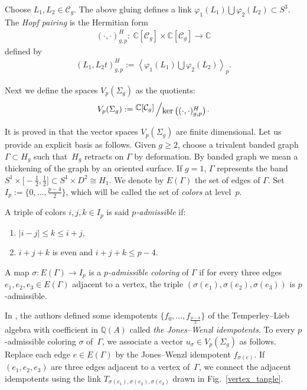 \documentclass[11pt]{article}
\numberwithin{equation}{section}
\begin{document}
Choose $L_1,L_2\in \mathcal{C}_g$. The above gluing defines a link $\varphi_1(L_1)\bigcup \varphi_2(L_2) \subset S^3$. The \textit{Hopf pairing} is the Hermitian form
\begin{gather*} ( \cdot , \cdot )_{g,p}^H \colon \ \mathbb{C}[\mathcal{C}_g]\times \mathbb{C}[\mathcal{C}_g] \rightarrow \mathbb{C}\end{gather*}
defined by \begin{gather*} ( L_1, L_2 t)_{g,p}^H := \left\langle \varphi_1(L_1)\bigcup \varphi_2(L_2) \right\rangle_p.\end{gather*}

Next we define the spaces $V_{p}(\Sigma_g)$ as the quotients:
\begin{gather*} V_{p}(\Sigma_g) := \quotient{ \mathbb{C}[\mathcal{C}_g]}{\ker \big(( \cdot , \cdot )_{g,p}^H \big)}.\end{gather*}

 It is proved in \cite{BHMV2} that the vector spaces $V_{p}(\Sigma_g)$ are finite dimensional. Let us provide an explicit basis as follows. Given $g\geq 2$, choose a trivalent banded graph $\Gamma \subset H_g$ such that~$H_g$ retracts on $\Gamma$ by deformation. By banded graph we mean a thickening of the graph by an oriented surface. If $g=1$, $\Gamma $ represents the band $S^1\times \big[{-}\frac{1}{2}, \frac{1}{2}\big] \subset S^1\times D^2 \cong H_1$. We denote by $E(\Gamma)$ the set of edges of $\Gamma$. Set $I_p:=\big\{0, \ldots, \frac{p-4}{2}\big\}$, which will be called the set of \textit{colors} at level~$p$.

A triple of colors $i,j,k \in I_p$ is said \textit{$p$-admissible} if:
\begin{enumerate}\itemsep=0pt
\item[1)] $|i-j|\leq k \leq i+j$,
\item[2)] $i+j+k$ is even and $i+j+k\leq p-4$.
\end{enumerate}

A map $\sigma \colon E(\Gamma) \rightarrow I_p$ is a \textit{$p$-admissible coloring} of $\Gamma$ if for every three edges $e_1,e_2,e_3\in E(\Gamma)$ adjacent to a vertex, the triple $(\sigma(e_1),\sigma(e_2),\sigma(e_3))$ is $p$-admissible.

In \cite{Jones_proj, Wenzl}, the authors defined some idempotents $\big\{ f_0, \ldots, f_{\frac{p-4}{2}} \big\}$ of the Temperley--Lieb algebra with coefficient in $\mathbb{Q}(A)$ called \textit{the Jones--Wenzl idempotents}. To every $p$-admissible coloring $\sigma$ of~$\Gamma$, we associate a vector $u_{\sigma}\in V_{p}(\Sigma_g)$ as follows. Replace each edge $e\in E(\Gamma)$ by the Jones--Wenzl idempotent $f_{\sigma(e)}$. If $(e_1,e_2,e_3)$ are three edges adjacent to a vertex of~$\Gamma$, we connect the adjacent idempotents using the link $T_{\sigma(e_1),\sigma(e_2),\sigma(e_3)}$ drawn in Fig.~\ref{vertex_tangle}.
\end{document}
